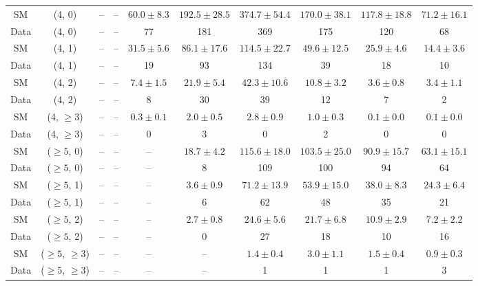 \begin{table}[h!]
{\begin{tabular}{cccccccccc}
	SM & (4, 0) & -- & -- & $60.0\pm 8.3$ & $192.5\pm 28.5$ & $374.7\pm 54.4$ & $170.0\pm 38.1$ & $117.8\pm 18.8$ & $71.2\pm 16.1$ \\[0.5ex] 
	Data & (4, 0) & -- & -- & 77 & 181 & 369 & 175 & 120 & 68 \\[0.5ex] 
	SM & (4, 1) & -- & -- & $31.5\pm 5.6$ & $86.1\pm 17.6$ & $114.5\pm 22.7$ & $49.6\pm 12.5$ & $25.9\pm 4.6$ & $14.4\pm 3.6$ \\[0.5ex] 
	Data & (4, 1) & -- & -- & 19 & 93 & 134 & 39 & 18 & 10 \\[0.5ex] 
	SM & (4, 2) & -- & -- & $7.4\pm 1.5$ & $21.9\pm 5.4$ & $42.3\pm 10.6$ & $10.8\pm 3.2$ & $3.6\pm 0.8$ & $3.4\pm 1.1$ \\[0.5ex] 
	Data & (4, 2) & -- & -- & 8 & 30 & 39 & 12 & 7 & 2 \\[0.5ex] 
	SM & (4, $\ge3$) & -- & -- & $0.3\pm 0.1$ & $2.0\pm 0.5$ & $2.8\pm 0.9$ & $1.0\pm 0.3$ & $0.1\pm 0.0$ & $0.1\pm 0.0$ \\[0.5ex] 
	Data & (4, $\ge3$) & -- & -- & 0 & 3 & 0 & 2 & 0 & 0 \\[0.5ex] 
	SM & ($\ge5$, 0) & -- & -- & -- & $18.7\pm 4.2$ & $115.6\pm 18.0$ & $103.5\pm 25.0$ & $90.9\pm 15.7$ & $63.1\pm 15.1$ \\[0.5ex] 
	Data & ($\ge5$, 0) & -- & -- & -- & 8 & 109 & 100 & 94 & 64 \\[0.5ex] 
	SM & ($\ge5$, 1) & -- & -- & -- & $3.6\pm 0.9$ & $71.2\pm 13.9$ & $53.9\pm 15.0$ & $38.0\pm 8.3$ & $24.3\pm 6.4$ \\[0.5ex] 
	Data & ($\ge5$, 1) & -- & -- & -- & 6 & 62 & 48 & 35 & 21 \\[0.5ex] 
	SM & ($\ge5$, 2) & -- & -- & -- & $2.7\pm 0.8$ & $24.6\pm 5.6$ & $21.7\pm 6.8$ & $10.9\pm 2.9$ & $7.2\pm 2.2$ \\[0.5ex] 
	Data & ($\ge5$, 2) & -- & -- & -- & 0 & 27 & 18 & 10 & 16 \\[0.5ex] 
	SM & ($\ge5$, $\ge3$) & -- & -- & -- & -- & $1.4\pm 0.4$ & $3.0\pm 1.1$ & $1.5\pm 0.4$ & $0.9\pm 0.3$ \\[0.5ex] 
	Data & ($\ge5$, $\ge3$) & -- & -- & -- & -- & 1 & 1 & 1 & 3 \\[0.5ex] 
	\hline
	\hline
\end{tabular}}
\end{table}

